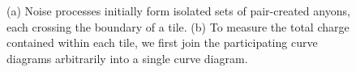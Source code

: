 \documentclass[aps, prl, letterpaper, twocolumn, superscriptaddress, notitlepage, 10pt]{revtex4-1}
\begin{document}
\begin{figure}[t!]
\begin{center}
\caption{
(a) Noise processes initially form isolated sets of pair-created anyons, 
each crossing the boundary of a tile. 
(b) To measure the total charge 
contained within each tile, 
we first join the participating curve 
diagrams arbitrarily into a single curve diagram.
}
\end{center}
\end{figure}
\end{document}
